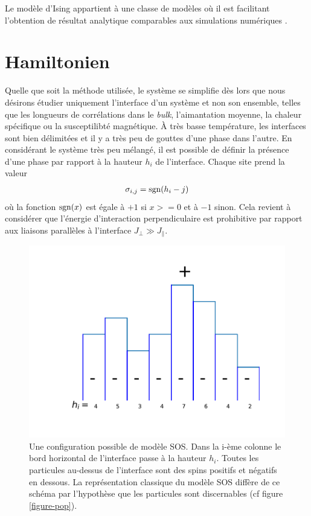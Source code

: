 Le modèle d'Ising appartient à une classe de modèles où il est facilitant l'obtention de résultat analytique \cite{hobrecht_critical_2017} comparables aux simulations numériques \cite{vasilyev_monte_2007,vasilyev_universal_2009,cardozo_finite_2015}.

    \section{Hamiltonien}
	
Quelle que soit la méthode utilisée, le système se simplifie dès lors que nous désirons étudier uniquement l'interface d'un système et non son ensemble, telles que les longueurs de corrélations dans le \textit{bulk}, l'aimantation moyenne, la chaleur spécifique ou la susceptilibté magnétique. À très basse température, les interfaces sont bien délimitées et il y a très peu de gouttes d'une phase dans l'autre. En considérant le système très peu mélangé, il est possible de définir la présence d'une phase par rapport à la hauteur $h_i$ de l'interface. Chaque site prend la valeur
\begin{align*}
	\sigma_{i,j} = \operatorname{sgn}(h_i-j)
\end{align*}
où la fonction $\operatorname{sgn}(x)$ est égale à $+1$ si $x>=0$ et à $-1$ sinon. Cela revient à considérer que l'énergie d'interaction perpendiculaire est prohibitive par rapport aux liaisons parallèles à l'interface $J_\perp \gg J_\parallel$. 

\begin{figure}
	\centering
	\includegraphics[scale=1]{isingtosos/sos-indiscernable.pdf}
	\caption{Une configuration possible de modèle SOS. Dans la i-ème colonne le bord horizontal de l'interface passe à la hauteur $h_i$. Toutes les particules au-dessus de l'interface sont des spins positifs et négatifs en dessous. La représentation classique du modèle SOS diffère de ce schéma par l'hypothèse que les particules sont discernables (cf figure \ref{figure-pop}).}
    \label{figure-sos}
\end{figure}


